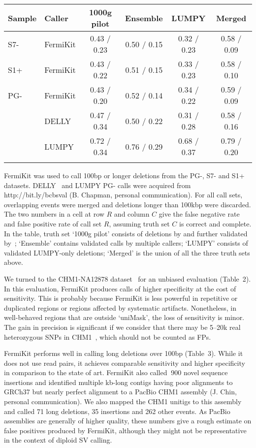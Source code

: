\documentclass{bioinfo}
\begin{document}
\begin{table}[h]
{\footnotesize
\begin{tabular}{llcccc}
\toprule
Sample& Caller  & {1000g pilot} & {Ensemble} & {LUMPY} & {Merged}\\
\midrule
S7- & FermiKit  & 0.43 / 0.23 & 0.50 / 0.15 & 0.32 / 0.23 & 0.58 / 0.09 \\
S1+ & FermiKit  & 0.43 / 0.22 & 0.51 / 0.15 & 0.33 / 0.23 & 0.58 / 0.10 \\
PG- & FermiKit  & 0.43 / 0.20 & 0.52 / 0.14 & 0.34 / 0.22 & 0.59 / 0.09\\
    & DELLY     & 0.47 / 0.34 & 0.50 / 0.22 & 0.31 / 0.28 & 0.58 / 0.16\\
    & LUMPY     & 0.72 / 0.34 & 0.76 / 0.29 & 0.68 / 0.37 & 0.79 / 0.20\\
\botrule
\end{tabular}}{FermiKit was used to call 100bp or longer deletions from the
PG-, S7- and S1+ datasets. DELLY~\citep{Rausch:2012aa} and LUMPY PG- calls were
acquired from http://bit.ly/bcbsval (B. Chapman, personal communication). For
all call sets, overlapping events were merged and deletions longer than 100kbp
were discarded.  The two numbers in a cell at row $R$ and column $C$ give the
false negative rate and false positive rate of call set $R$, assuming truth set
$C$ is correct and complete.  In the table, truth set `1000g pilot' consists of
deletions by \citet{Mills:2011aa} and further validated
by~\citet{Layer:2014aa}; `Ensemble' contains validated calls by multiple
callers; `LUMPY' consists of validated LUMPY-only deletions; `Merged' is the
union of all the three truth sets above.}
\end{table}

We turned to the CHM1-NA12878 dataset~\citep{Li:2014aa} for an unbiased
evaluation (Table~2). In this evaluation, FermiKit produces calls of higher
specificity at the cost of sensitivity. This is probably because FermiKit is
less powerful in repetitive or duplicated regions or regions affected by
systematic artifacts. Nonetheless, in well-behaved regions that are outside
`uniMask', the loss of sensitivity is minor. The gain in precision is
significant if we consider that there may be 5--20k real heterozygous SNPs in
CHM1~\citep{Li:2014aa}, which should not be counted as FPs.

FermiKit performs well in calling long deletions over 100bp (Table~3). While
it does not use read pairs, it achieves comparable sensitivity and higher
specificity in comparison to the state of art. FermiKit also called $~$900
novel sequence insertions and identified multiple kb-long contigs having 
poor alignments to GRCh37 but nearly perfect alignment to a PacBio CHM1
assembly (J. Chin, personal communication). We also mapped the CHM1 unitigs to
this assembly and called 71 long deletions, 35 insertions and 262 other events.
As PacBio assemblies are generally of higher quality, these numbers give a
rough estimate on false positives produced by FermiKit, although they might not
be representative in the context of diploid SV calling.
\end{document}
